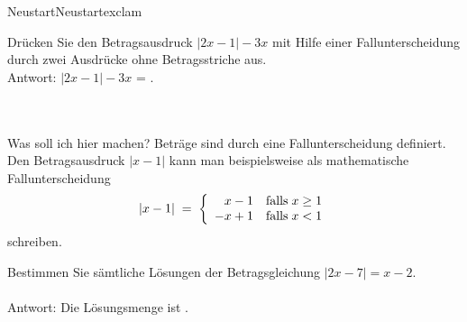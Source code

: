 \begin{MXContent}{Neustart}{Neustart}{exclam}
\begin{MExercise}
Drücken Sie den Betragsausdruck $|2x-1|-3x$ mit Hilfe einer Fallunterscheidung durch zwei Ausdrücke ohne Betragsstriche aus.\\
Antwort: $|2x-1|-3x$ = .\\
\ \\ \ \\
\begin{MHint}{Was soll ich hier machen?}
Beträge sind durch eine Fallunterscheidung definiert.
Den Betragsausdruck $|x-1|$ kann man beispielsweise als mathematische Fallunterscheidung
$$
|x-1| \;=\; \left\lbrace{\begin{array}{rl} x-1 & \text{falls}\;x\geq 1 \\ -x+1 & \text{falls}\; x<1 \end{array}}\right.
$$
schreiben.\\
\end{MHint}
\end{MExercise}

% 

\begin{MExercise}
Bestimmen Sie sämtliche Lösungen der Betragsgleichung $|2x-7|=x-2$.
\ \\ \ \\
Antwort: Die Lösungsmenge ist .\\
\end{MExercise}



\end{MXContent}
